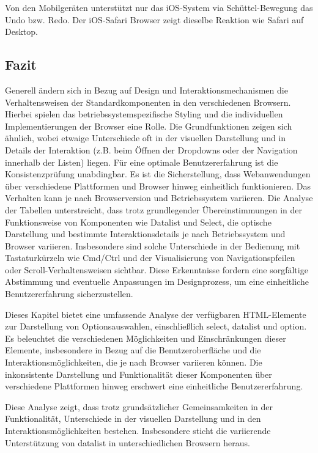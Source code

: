 Von den Mobilgeräten unterstützt nur das iOS-System via Schüttel-Bewegung das Undo bzw. Redo. 
Der iOS-Safari Browser zeigt dieselbe Reaktion wie Safari auf Desktop. 


\clearpage
\subsection{Fazit}
\label{sec:summeryExisting}

Generell ändern sich in Bezug auf Design und Interaktionsmechanismen die Verhaltensweisen der Standardkomponenten in den verschiedenen Browsern. 
Hierbei spielen das betriebssystemspezifische Styling und die individuellen Implementierungen der Browser eine Rolle. 
Die Grundfunktionen zeigen sich ähnlich, wobei etwaige Unterschiede oft in der visuellen Darstellung und in Details der Interaktion (z.B. beim Öffnen der Dropdowns oder der Navigation innerhalb der Listen) liegen. 
Für eine optimale Benutzererfahrung ist die Konsistenzprüfung unabdingbar. 
Es ist die Sicherstellung, dass Webanwendungen über verschiedene Plattformen und Browser hinweg einheitlich funktionieren. 
Das Verhalten kann je nach Browserversion und Betriebssystem variieren. 
Die Analyse der Tabellen unterstreicht, dass trotz grundlegender Übereinstimmungen in der Funktionsweise von Komponenten wie Datalist und Select, 
die optische Darstellung und bestimmte Interaktionsdetails je nach Betriebssystem und Browser variieren. 
Insbesondere sind solche Unterschiede in der Bedienung mit Tastaturkürzeln wie Cmd/Ctrl und der Visualisierung von Navigationspfeilen oder Scroll-Verhaltensweisen sichtbar. 
Diese Erkenntnisse fordern eine sorgfältige Abstimmung und eventuelle Anpassungen im Designprozess, um eine einheitliche Benutzererfahrung sicherzustellen. 

Dieses Kapitel bietet eine umfassende Analyse der verfügbaren HTML-Elemente zur Darstellung von Optionsauswahlen, einschließlich select, datalist und option. 
Es beleuchtet die verschiedenen Möglichkeiten und Einschränkungen dieser Elemente, insbesondere in Bezug auf die Benutzeroberfläche und die Interaktionsmöglichkeiten, die je nach Browser variieren können. 
Die inkonsistente Darstellung und Funktionalität dieser Komponenten über verschiedene Plattformen hinweg erschwert eine einheitliche Benutzererfahrung. 

Diese Analyse zeigt, dass trotz grundsätzlicher Gemeinsamkeiten in der Funktionalität, Unterschiede in der visuellen Darstellung und in den Interaktionsmöglichkeiten bestehen. 
Insbesondere sticht die variierende Unterstützung von datalist in unterschiedlichen Browsern heraus. 

